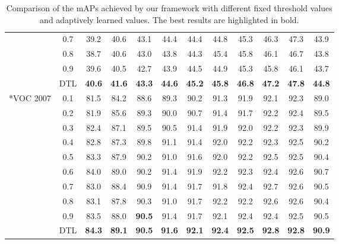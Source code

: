 \begin{table*}[!t]
\begin{tabular}{c|c|ccccccccc|c}
  \centering ~ & 0.7 & 39.2 & 40.6 & 43.1 & 44.4 & 44.4 & 44.8 & 45.3 & 46.3 & 47.3 & 43.9 \\
  \centering ~ & 0.8 & 38.7 & 40.6 & 43.0 & 43.8 & 44.3 & 45.4 & 45.8 & 46.1 & 46.7 & 43.8 \\
  \centering ~ & 0.9 & 39.6 & 40.5 & 42.7 & 43.9 & 44.5 & 44.9 & 45.3 & 45.8 & 46.1 & 43.7 \\
  \hline
  \centering ~ & DTL & \textbf{40.6} & \textbf{41.6} & \textbf{43.3} & \textbf{44.6} & \textbf{45.2} & \textbf{45.8} & \textbf{46.8} & \textbf{47.2} & \textbf{47.8} & \textbf{44.8} \\
  \hline
  \hline
  \centering \multirow{9}*{VOC 2007} & 0.1 & 81.5 & 84.2 & 88.6 & 89.3 & 90.2 & 91.3 & 91.9 & 92.1 & 92.3 & 89.0 \\
  \centering ~ & 0.2 & 81.9 & 85.6 & 89.3 & 90.0 & 90.7 & 91.4 & 91.7 & 92.2 & 92.4 & 89.5 \\
  \centering ~ & 0.3 & 82.4 & 87.1 & 89.5 & 90.5 & 91.4 & 91.9 & 92.0 & 92.2 & 92.3 & 89.9 \\
  \centering ~ & 0.4 & 82.8 & 87.3 & 89.8 & 91.1 & 91.4 & 92.0 & 92.2 & 92.3 & 92.5 & 90.2 \\
  \centering ~ & 0.5 & 83.3 & 87.9 & 90.2 & 91.0 & 91.6 & 92.0 & 92.2 & 92.5 & 92.5 & 90.4 \\
  \centering ~ & 0.6 & 84.0 & 89.0 & 90.2 & 91.4 & 91.9 & 92.2 & 92.3 & 92.4 & 92.6 & 90.7 \\
  \centering ~ & 0.7 & 83.0 & 88.4 & 90.9 & 91.4 & 91.7 & 91.8 & 92.4 & 92.7 & 92.6 & 90.5 \\
  \centering ~ & 0.8 & 83.1 & 87.8 & 90.3 & 91.0 & 91.7 & 92.2 & 92.2 & 92.6 & 92.6 & 90.4 \\
  \centering ~ & 0.9 & 83.5 & 88.0 & \textbf{90.5} & 91.4 & 91.7 & 92.1 & 92.4 & 92.4 & 92.5 & 90.5 \\
  \hline
  \centering ~ & DTL & \textbf{84.3} & \textbf{89.1} & \textbf{90.5} & \textbf{91.6} & \textbf{92.1} & \textbf{92.4} & \textbf{92.5} & \textbf{92.8} & \textbf{92.8} & \textbf{90.9} \\
  \hline
  \end{tabular}
  \vspace{0pt}
  \caption{Comparison of the mAPs achieved by our framework with different fixed threshold values and adaptively learned values. The best results are highlighted in bold.}
  \label{tab:fixed-threshold}
\end{table*}

